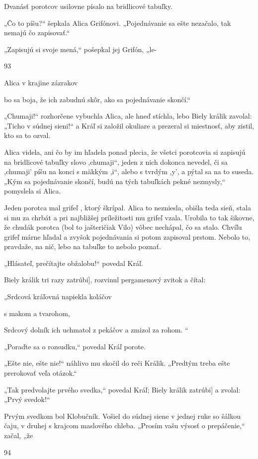 \documentclass[12pt]{book}
\begin{document}
\begin{Parallel}[p]{}{}
{Dvanásť porotcov usilovne písalo na bridlicové tabuľky.

„Čo to píšu?“ šepkala Alica Grifónovi. „Pojednávanie
sa ešte nezačalo, tak nemajú čo zapisovať.“

„Zapisujú si svoje mená,“ pošepkal jej Grifón, „le-

93

Alica v krajine zázrakov

bo sa boja, že ich zabudnú skôr, ako sa pojednávanie
skončí.“

„Chumaji!“ rozhorčene vybuchla Alica, ale hneď stíchla,
lebo Biely králik zavolal: „Ticho v súdnej sieni!“ a Kráľ si
založil okuliare a prezeral si miestnosť, aby zistil, kto sa to
ozval.

Alica videla, ani čo by im hľadela ponad plecia, že všetci
porotcovia si zapisujú na bridlicové tabuľky slovo ,chumaji“,
jeden z nich dokonca nevedel, či sa ,chumaji' píšu na konci
s mäkkým ,i“, alebo s tvrdým ,y', a pýtal sa na to suseda.
„Kým sa pojednávanie skončí, budú na tých tabuľkách
pekné nezmysly,“ pomyslela si Alica.

Jeden porotca mal grifeľ , ktorý škrípal. Alica to nezniesla,
obišla teda sieň, stala si mu za chrbát a pri najbližšej
príležitosti mu grifeľ vzala. Urobila to tak šikovne, že
chudák porotca (bol to jašteričiak Vilo) vôbec nechápal, čo
sa stalo. Chvíľu grifeľ márne hľadal a zvyšok pojednávania
si potom zapisoval prstom. Nebolo to, pravdaže, na nič,
lebo na tabuľke to nebolo poznať.

„Hlásateľ, prečítajte obžalobu!“ povedal Kráľ.

Biely králik tri razy zatrúbi], rozvinul pergamenový zvitok
a čítal:

„Srdcová kráľovná napiekla koláčov

s makom a tvarohom,

Srdcový dolník ich uchmatol z pekáčov
a zmizol za rohom. “

„Poraďte sa o rozsudku,“ povedal Kráľ porote.

„Ešte nie, ešte nie!“ náhlivo mu skočil do reči Králik.
„Predtým treba ešte prerokovať veľa otázok.“

„Tak predvolajte prvého svedka,“ povedal Kráľ; Biely
králik zatrúbi] a zvolal: „Prvý svedok!“

Prvým svedkom bol Klobučník. Vošiel do súdnej siene
v jednej ruke so šálkou čaju, v druhej s krajcom maslového
chleba. „Prosím vašu výsosť o prepáčenie,“ začal, „že

94

}
\end{Parallel}
\end{document}
